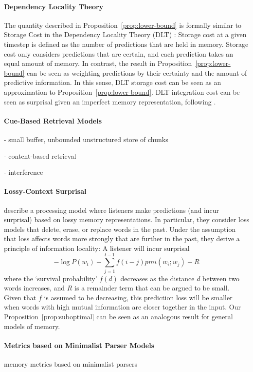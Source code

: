 \paragraph{Dependency Locality Theory}
The quantity described in Proposition~\ref{prop:lower-bound} is formally similar to Storage Cost in the Dependency Locality Theory (DLT) \citep{gibson-linguistic-1998}: Storage cost at a given timestep is defined as the number of predictions that are held in memory.
Storage cost only considers predictions that are certain, and each prediction takes an equal amount of memory.
In contrast, the result in Proposition~\ref{prop:lower-bound} can be seen as weighting predictions by their certainty and the amount of predictive information.
In this sense, DLT storage cost can be seen as an approximation to Proposition~\ref{prop:lower-bound}.
DLT integration cost can be seen as surprisal given an imperfect memory representation, following \cite{futrell-noisy-context-2017}.

\paragraph{Cue-Based Retrieval Models}
- small buffer, unbounded unstructured store of chunks

- content-based retrieval

- interference

\paragraph{Lossy-Context Surprisal}
\citet{futrell-noisy-context-2017} describe a processing model where listeners make predictions (and incur surprisal) based on lossy memory representations.
In particular, they consider loss models that delete, erase, or replace words in the past.
Under the assumption that loss affects words more strongly that are further in the past, they derive a principle of information locality:
A listener will incur surprisal
$$ -\log P(w_t) - \sum_{j=1}^{t-1} f(i-j) pmi(w_i; w_j) + R$$
where the `survival probability' $f(d)$ decreases as the distance $d$ between two words increases, and $R$ is a remainder term that can be argued to be small.
Given that $f$ is assumed to be decreasing, this prediction loss will be smaller when words with high mutual information are closer together in the input.
Our Proposition~\ref{prop:suboptimal} can be seen as an analogous result for general models of memory.


\paragraph{Metrics based on Minimalist Parser Models}
memory metrics based on minimalist parsers

